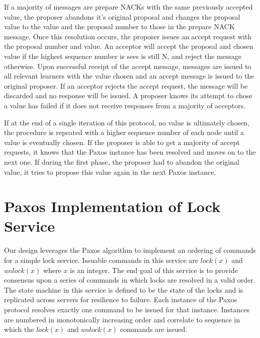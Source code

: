 \documentclass{article}
\begin{document}
If a majority of messages are prepare NACKs with the same previously accepted value, the proposer abandons it's original proposal and changes the proposal value to the value and the proposal number to those in the prepare NACK message.
Once this resolution occurs, the proposer issues an accept request with the proposal number and value.
An acceptor will accept the proposal and chosen value if the highest sequence number is sees is still N, and reject the message otherwise.
Upon successful receipt of the accept message, messages are issued to all relevant learners with the value chosen and an accept message is issued to the original proposer.
If an acceptor rejects the accept request, the message will be discarded and no response will be issued.
A proposer knows its attempt to chose a value has failed if it does not receive responses from a majority of acceptors.

If at the end of a single iteration of this protocol, no value is ultimately chosen, the procedure is repeated with a higher sequence number of each node until a value is eventually chosen.
If the proposer is able to get a majority of accept requests, it knows that the Paxos instance has been resolved and moves on to the next one.
If during the first phase, the proposer had to abandon the original value, it tries to propose this value again in the next Paxos instance.


\section{Paxos Implementation of Lock Service}

Our design leverages the Paxos algorithm to implement an ordering of commands for a simple lock service.
Issuable commands in this service are $lock(x)$ and $unlock(x)$ where $x$ is an integer.
The end goal of this service is to provide consensus upon a series of commands in which locks are resolved in a valid order.
The state machine in this service is defined to be the state of the locks and is replicated across servers for resilience to failure.
Each instance of the Paxos protocol resolves exactly one command to be issued for that instance.
Instances are numbered in monotonically increasing order and correlate to sequence in which the $lock(x)$ and $unlock(x)$ commands are issued.
\end{document}
